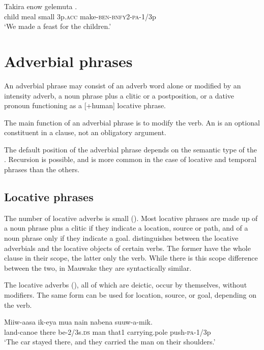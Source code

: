 \ea%
\label{ex:4:x851}
\gll Takira  enow  gelemuta   . \\
   child  meal  small  3p.\textsc{acc}  make-\textsc{ben}-\textsc{bnfy}2-\textsc{pa}-1/3p   \\
\glt`We made a feast for the children.'
\z

\section{Adverbial phrases} \label{sec:4.6}
{}
An adverbial phrase may consist of an adverb word alone or modified by an intensity adverb, a noun phrase plus a clitic or a postposition, or a dative pronoun functioning as a [+human] locative phrase.

The main function of an adverbial phrase is to modify the verb. An  is an optional constituent in a clause, not an obligatory argument. 

The default position of the adverbial phrase depends on the semantic type of the . Recursion is possible, and is more common in the case of locative and temporal phrases than the others.

\subsection{Locative phrases} \label{sec:4.6.1}
{}
The number of locative adverbs is small (). Most locative phrases are made up of a noun phrase plus a clitic if they indicate a location, source or path, and of a noun phrase only if they indicate a goal. \citet[78, 110--112]{Givon1984} distinguishes between the locative adverbials and the locative objects of certain verbs. The former have the whole clause in their scope, the latter only the verb. While there is this scope difference between the two, in Mauwake they are syntactically similar. 

The locative adverbs (), all of which are deictic, occur by themselves, without modifiers. The same form can be used for location, source, or goal, depending on the verb.

\ea%
\label{ex:4:x870}
\gll Miiw-aasa    ik-eya  mua  nain  nabena  suuw-a-mik. \\
   land-canoe  there  be-2/3s.\textsc{ds}  man  that1  carrying.pole  push-\textsc{pa}-1/3p   \\
\glt`The car stayed there, and they carried the man on their shoulders.'
\z

